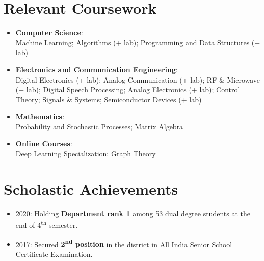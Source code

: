\documentclass[letterpaper,10pt]{article}
\newcommand{\resumeItem}[2]{
  \item\small{
    \textbf{#1}{: #2 \vspace{-2pt}}
  }
}
\newcommand{\resumeSubItem}[2]{\resumeItem{#1}{#2}\vspace{-4pt}}
\newcommand{\resumeSubHeadingListStart}{\begin{itemize}[leftmargin=*]}
\newcommand{\resumeSubHeadingListEnd}{\end{itemize}}
\begin{document}
 \section{Relevant Coursework}
  \resumeSubHeadingListStart
    \resumeSubItem{Computer Science}
      {\\Machine Learning; Algorithms (+ lab); Programming and Data Structures (+ lab)}
    \resumeSubItem{Electronics and Communication Engineering}
      {\\Digital Electronics (+ lab); Analog Communication (+ lab); RF \& Microwave (+ lab); Digital Speech Processing; Analog Electronics (+ lab); Control Theory; Signals \& Systems; Semiconductor Devices (+ lab)}
    \resumeSubItem{Mathematics}
      {\\Probability and Stochastic Processes; Matrix Algebra}
    \resumeSubItem{Online Courses}
      {\\Deep Learning Specialization; Graph Theory}
  \resumeSubHeadingListEnd

\section{Scholastic Achievements}
  \resumeSubHeadingListStart
      \itemsep-0.5em
      \item{2020: Holding \textbf{Department rank 1} among 53 dual degree students at the end of 4\textsuperscript{th} semester.}
      \item{2017: Secured \textbf{2\textsuperscript{nd} position} in the district in All India Senior School Certificate Examination.}
      
  \resumeSubHeadingListEnd
\end{document}
